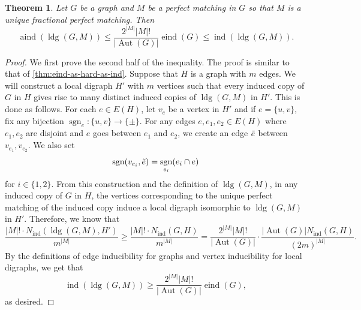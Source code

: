 \documentclass[reqno,11pt]{amsart}
\numberwithin{equation}{section}
\newtheorem{theorem}{Theorem}[section]
\theoremstyle{definition}
\theoremstyle{remark}
\newcommand{\abs}[1]{\left\lvert#1\right\rvert}
\DeclareMathOperator{\sgn}{sgn}
\DeclareMathOperator{\ind}{ind}
\DeclareMathOperator{\eind}{eind}
\DeclareMathOperator{\aind}{aind}
\DeclareMathOperator{\ldg}{ldg}
\DeclareMathOperator{\Aut}{Aut}
\begin{document}
\begin{theorem}\label{thm:aind-eind-ind}
    Let $G$ be a graph and $M$ be a perfect matching in $G$ so that $M$ is a unique fractional perfect matching.
    Then 
    \[\aind(\ldg(G,M))\leq \frac{2^{\abs{M}}\abs{M}!}{\abs{\Aut(G)}}\eind(G)\leq \ind(\ldg(G,M)).\]
\end{theorem}
\begin{proof}
    We first prove the second half of the inequality.
    The proof is similar to that of \cref{thm:eind-as-hard-as-ind}.
    Suppose that $H$ is a graph with $m$ edges.
    We will construct a local digraph $H'$ with $m$ vertices such that every induced copy of $G$ in $H$ gives rise to many distinct induced copies of $\ldg(G,M)$ in $H'$. This is done as follows.
    For each $e\in E(H)$, let $v_e$ be a vertex in $H'$ and if $e=\{u,v\}$, fix any bijection $\sgn_e\colon\{u,v\}\to \{\pm\}$.
    For any edges $e,e_1,e_2\in E(H)$ where $e_1,e_2$ are disjoint and $e$ goes between $e_1$ and $e_2$, we create an edge $\Tilde{e}$ between $v_{e_1},v_{e_2}$. 
    We also set
    \[\sgn(v_{e_i},\Tilde{e}) = \sgn_{e_i}(e_i\cap e)\]
    for $i\in\{1,2\}$.
     From this construction and the definition of $\ldg(G,M)$, in any induced copy of $G$ in $H$, the vertices corresponding to the unique perfect matching of the induced copy induce a local digraph isomorphic to $\ldg(G,M)$ in $H'$.
    Therefore, we know that 
    \[\frac{\abs{M}!\cdot N_{\ind}(\ldg(G,M),H')}{m^{\abs{M}}}\geq \frac{\abs{M}!\cdot N_{\ind}(G,H)}{m^{\abs{M}}}= \frac{2^{\abs{M}}\abs{M}!}{\abs{\Aut(G)}}\cdot\frac{ \abs{\Aut(G)}N_{\ind}(G,H)}{(2m)^{\abs{M}}}.\]
    By the definitions of edge inducibility for graphs and vertex inducibility for local digraphs, we get that
    \[\ind(\ldg(G,M))\geq  \frac{2^{\abs{M}}\abs{M}!}{\abs{\Aut(G)}}\eind(G),\]
    as desired.


\end{proof}
\end{document}

